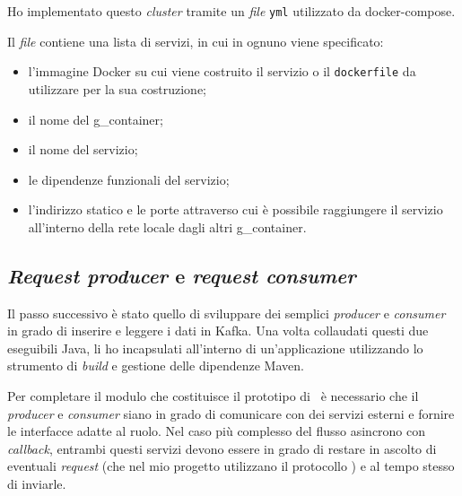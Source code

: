 Ho implementato questo \textit{cluster} tramite un
\textit{file} \texttt{yml} utilizzato da docker-compose.

\noindent
Il \textit{file} contiene una lista di servizi, in cui in ognuno viene specificato:
\begin{itemize}
  \item l'immagine Docker su cui viene costruito il servizio o il \texttt{dockerfile} da utilizzare per la sua costruzione;
  \item il nome del \gls{g_container};
  \item il nome del servizio;
  \item le dipendenze funzionali del servizio;
  \item l'indirizzo  statico e le porte attraverso cui è possibile raggiungere il servizio all'interno della rete locale dagli altri \gls{g_container}.
\end{itemize}

\subsection{\textit{Request producer} e \textit{request consumer}}

Il passo successivo è stato quello di sviluppare dei semplici \textit{producer} e \textit{consumer} in grado di inserire e leggere i dati in Kafka.
Una volta collaudati questi due eseguibili Java, li ho incapsulati all'interno di un'applicazione utilizzando lo strumento di \textit{build} e gestione delle dipendenze Maven.

Per completare il modulo che costituisce il prototipo di \middleware\ è necessario che il \textit{producer} e \textit{consumer} siano in grado di comunicare con dei servizi esterni e fornire le interfacce adatte al ruolo.
Nel caso più complesso del flusso asincrono con \textit{callback}, entrambi questi servizi devono essere in grado di restare in ascolto di eventuali  \textit{request} (che nel mio progetto utilizzano il protocollo ) e al tempo stesso di inviarle.

